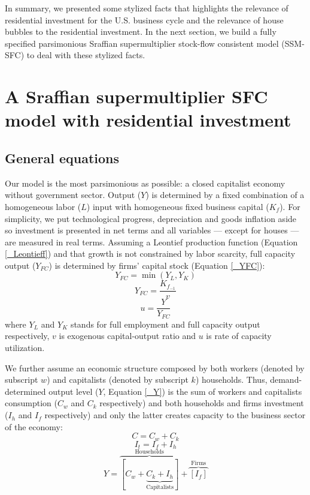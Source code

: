 \documentclass[12pt]{article}
\begin{document}
In summary, we presented some stylized facts that highlights the relevance of residential investment for the U.S. business cycle and the relevance of house bubbles to the residential investment.
In the next section, we build a fully specified parsimonious Sraffian supermultiplier stock-flow consistent model (SSM-SFC) to deal with these stylized facts.


\section{A Sraffian supermultiplier SFC model with residential investment}
\label{sec:org4ee1f5b}
\label{sec:Model}
\subsection{General equations}
\label{sec:orgceda425}

Our model is the most parsimonious as possible: a closed capitalist economy without government sector. Output (\(Y\)) is determined by  a fixed combination of a homogeneous labor (\(L\)) input with homogeneous fixed business capital (\(K_f\)). 
For simplicity, we put technological progress, depreciation and goods inflation aside so investment is presented in net terms and all variables --- except for houses --- are measured in real terms.
Assuming a Leontief production function (Equation \ref{_Leontieff}) and that growth is not constrained by labor scarcity, full capacity output (\(Y_{FC}\)) is
determined by firms' capital stock (Equation \ref{_YFC}):
\begin{equation}
\label{_Leontieff}
    Y_{FC} = \min (Y_L, Y_K)
\end{equation}
\begin{equation}
\label{_YFC}
    Y_{FC} = \frac{K_{f_{-1}}}{v}
\end{equation}
\begin{equation}
\label{_u}
    u = \frac{Y}{Y_{FC}}
\end{equation}
where \(Y_L\) and \(Y_K\) stands for full employment and full capacity output respectively, \(v\) is exogenous capital-output ratio and \(u\) is rate of capacity utilization.

We further assume an economic structure composed by both workers (denoted by subscript \(w\)) and capitalists (denoted by subscript \(k\)) households.
Thus, demand-determined output level (\(Y\), Equation \ref{_Y})  is the sum of workers and capitalists consumption (\(C_w\) and \(C_k\) respectively) and both households and firms investment (\(I_h\) and \(I_f\) respectively) and only the latter creates capacity to the business sector of the economy:
\begin{equation}
\label{_Ct}
    C = C_w + C_k
\end{equation}
\begin{equation}
\label{_It}
    I_t = I_f + I_h
\end{equation}
\begin{equation}
\label{_Y}
    Y = \overbrace{[C_w + \underbrace{C_k + I_h}_{\text{Capitalists}}]}^{\text{Households}} + \overbrace{[I_f]}^{\text{Firms}}
\end{equation}
\end{document}
